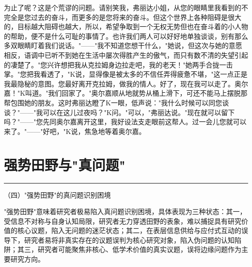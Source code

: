\documentclass[12pt,a4paper]{article}
\begin{document}
为止了呢？这是个荒谬的问题。请别笑我，弗丽达小姐，从您的眼睛里我看到的不完全是您过去的奋斗，而更多的是您将来的奋斗。但这个世界上各种阻碍是很大的，目标越大阻碍也越大，所以，希望争取到一个无权无势但也在奋斗着的小人物的帮助，便不是什么可耻的事情了。也许我们两人可以好好地单独谈谈，别有那么多双眼睛盯着我们说话。"——"我不知道您想干什么，"她说，但这次与她的意愿相反，语调中已听不到她在生活中屡次得胜产生的傲气，而只有数不清的失望引起的凄楚了。"您兴许想把我从克拉姆身边拉走吧，我的老天！"她两手合拢一击掌。"您把我看透了，"K说，显得像是被太多的不信任弄得疲惫不堪，"这一点正是我最隐秘的意图。您最好离开克拉姆，做我的情人。好了，现在我可以走了。奥尔嘉！"K叫道。"我们回家了。"奥尔嘉顺从地就势从桶上滑下，可还不能马上摆脱那帮包围她的朋友。这时弗丽达瞪了K一眼，低声说："我什么时候可以同您谈谈？"——"我可以在这儿过夜吗？"K问。"可以，"弗丽达说。"现在就可以留下吗？"——"您先同奥尔嘉离开这里，我好设法支走眼前这帮人。过一会儿您就可以来了。"——"好吧，"K说，焦急地等着奥尔嘉。
\par{}
\newpage
\section{强势田野与"真问题"}
\vspace{0.5em}
\vspace{0.3em}

\noindent\rule{\textwidth}{0.4pt}

\vspace{0.3em}



（四）"强势田野"的真问题识别困境



"强势田野"意味着研究者极易陷入真问题识别困境，具体表现为三种状态：其一，受信息不对称与自身认知局限，研究者无力穿透田野的表象，难以捕捉具有研究价值的核心议题，陷入无问题的迷茫状态；其二，在表层信息供给与应付式互动的误导下，研究者易将非真实存在的议题误判为核心研究对象，陷入伪问题的认知陷阱；其三，研究者可能聚焦非核心、低学术价值的真实议题，误将边缘问题作为主要研究方向。
\end{document}
